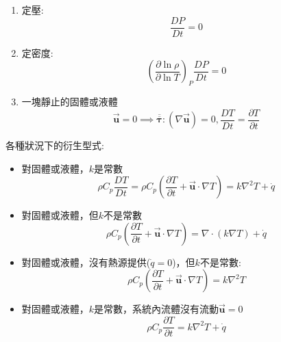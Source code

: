 \documentclass[../main.tex]{subfiles}
\begin{document}
\begin{itemize}
\begin{itemize}
\begin{enumerate}
\begin{equation}
            \overline{\overline{\bm \tau}} : \left(\nabla \vec{\bm u}\right) = \mu \bm \Phi_u
          \end{equation}
          再進一步，計算熱傳時，通常以溫度為主要影響，會忽略它
          \item 定壓:
          \begin{equation}
            \frac{D P}{D t} = 0
          \end{equation}
          \item 定密度:
          \begin{equation}
            \left(
              \frac{\partial \ln \rho}{\partial \ln T}
            \right)_P\frac{D P}{D t} = 0
          \end{equation}
          \item 一塊靜止的固體或液體
          \begin{equation}
            \vec{\bm u} = 0 \implies \overline{\overline{\bm \tau}} : \left(\nabla \vec{\bm u}\right) = 0,\frac{DT}{Dt} 
            = \frac{\partial T}{\partial t}
          \end{equation}
        \end{enumerate}
        各種狀況下的衍生型式:
        \begin{itemize}
          \item 對固體或液體，$k$是常數
            \begin{equation}
              \rho C_p\frac{DT}{Dt} = \rho C_p \left(\frac{\partial T}{\partial t}+\vec {\bm u} \cdot \nabla T\right) = k\nabla^2 T + \dot q
            \end{equation}
            \item 對固體或液體，但$k$不是常數
            \begin{equation}
              \rho C_p \left(\frac{\partial T}{\partial t}+\vec {\bm u} \cdot \nabla T\right) = \nabla\cdot(k\nabla T) + \dot q
            \end{equation}
            \item 對固體或液體，沒有熱源提供($\dot q=0$)，但$k$不是常數:
            \begin{equation}
              \rho C_p \left(\frac{\partial T}{\partial t}+\vec {\bm u} \cdot \nabla T\right) = k\nabla^2 T
            \end{equation}
            \item 對固體或液體，$k$是常數，系統內流體沒有流動$\vec {\bm u}=0$
            \begin{equation}
              \rho C_p \frac{\partial T}{\partial t} = k\nabla^2 T + \dot q

\end{equation}
\end{itemize}
\end{itemize}
\end{itemize}
\end{document}
